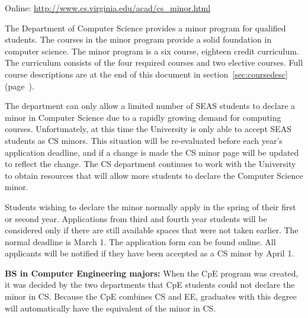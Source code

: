 \noindent Online: \url{http://www.cs.virginia.edu/acad/cs_minor.html}



The Department of Computer Science provides a minor program for
qualified students. The courses in the minor program provide a solid
foundation in computer science. The minor program is a six course,
eighteen credit curriculum. The curriculum consists of the four
required courses and two elective courses. Full course descriptions
are at the end of this document in section~\ref{sec:coursedesc}
(page~\pageref{sec:coursedesc}).

 
\label{minorapplicationprocess}

The department can only allow a limited number of SEAS students to
declare a minor in Computer Science due to a rapidly growing demand
for computing courses.  Unfortunately, at this time the University is
only able to accept SEAS students as CS minors. This situation will be
re-evaluated before each year's application deadline, and if a change
is made the CS minor
page will be
updated to reflect the change. The CS department continues to work
with the University to obtain resources that will allow more students
to declare the Computer Science minor.

Students wishing to declare the minor normally apply in the spring of
their first or second year. Applications from third and fourth year
students will be considered only if there are still available spaces
that were not taken earlier. The normal deadline is March 1. The
application form can be found
online.  All
applicants will be notified if they have been accepted as a CS minor
by April 1.

{\bf BS in Computer Engineering majors:} When the CpE program was created,
it was decided by the two departments that CpE students could not
declare the minor in CS. Because the CpE combines CS and EE, graduates
with this degree will automatically have the equivalent of the minor
in CS.

